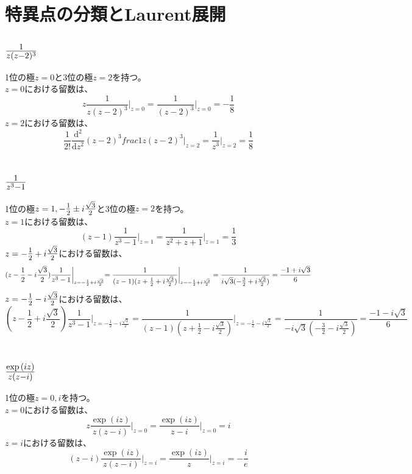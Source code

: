 \documentclass[dvipdfmx,a4paper]{jsarticle}
\begin{document}
\section{特異点の分類とLaurent展開}
\subsection{}
\subsubsection{$\mbox{\Large $\frac{1}{z(z-2)^3}$}$}
1位の極$z = 0$と3位の極$z = 2$を持つ。\\
$z = 0$における留数は、
$$
z\frac{1}{z(z-2)^3}\biggl|_{z = 0} = \frac{1}{(z-2)^3}\biggl|_{z = 0} = -\frac{1}{8}
$$
$z = 2$における留数は、
$$
\frac{1}{2!}\frac{\mathrm{d}^2}{\mathrm{d}z^2}(z-2)^3frac{1}{z(z-2)^3}\biggl|_{z = 2} = \frac{1}{z^3}\biggl|_{z = 2} = \frac{1}{8}
$$
\\

\subsubsection{$\mbox{\Large $\frac{1}{z^3-1}$}$}
1位の極$z = 1, -\mbox{\large $\frac{1}{2}$} \pm i \mbox{\large$\frac{\sqrt{3}}{2}$}$と3位の極$z = 2$を持つ。\\
$z = 1$における留数は、
$$
(z-1)\frac{1}{z^3-1}\biggl|_{z = 1} = \frac{1}{z^2 + z + 1}\biggl|_{z = 1} = \frac{1}{3}
$$
$z =  -\mbox{\large $\frac{1}{2}$} + i \mbox{\large$\frac{\sqrt{3}}{2}$}$における留数は、
$$
(z - \frac{1}{2} - i\frac{\sqrt{3}}{2})\frac{1}{z^3-1}\biggl|_{z = -\frac{1}{2} + i\frac{\sqrt{3}}{2}} = \frac{1}{(z-1)(z + \frac{1}{2} + i\frac{\sqrt{3}}{2})}\biggl|_{z = -\frac{1}{2} + i\frac{\sqrt{3}}{2}}\\
= \frac{1}{i\sqrt{3}(-\frac{3}{2} + i\frac{\sqrt{3}}{2})} = \frac{-1 + i\sqrt{3}}{6}
$$
$z =  -\mbox{\large $\frac{1}{2}$} - i \mbox{\large$\frac{\sqrt{3}}{2}$}$における留数は、
$$
(z - \frac{1}{2} + i\frac{\sqrt{3}}{2})\frac{1}{z^3-1}\biggl|_{z = -\frac{1}{2} - i\frac{\sqrt{3}}{2}} = \frac{1}{(z-1)(z + \frac{1}{2} - i\frac{\sqrt{3}}{2})}\biggl|_{z = -\frac{1}{2} - i\frac{\sqrt{3}}{2}}
= \frac{1}{-i\sqrt{3}(-\frac{3}{2} - i\frac{\sqrt{3}}{2})} = \frac{-1 - i\sqrt{3}}{6}
$$
\\

\subsubsection{$\mbox{\Large $\frac{\exp{(iz)}}{z(z-i)}$}$}
1位の極$z = 0, i$を持つ。\\
$z = 0$における留数は、
$$
z\frac{\exp{(iz)}}{z(z-i)}\biggr|_{z = 0} = \frac{\exp{(iz)}}{z-i}\biggr|_{z = 0} = i
$$
$z = i$における留数は、
$$
(z-i)\frac{\exp{(iz)}}{z(z-i)}\biggr|_{z = i} = \frac{\exp{(iz)}}{z}\biggr|_{z = i} = -\frac{i}{e}
$$
\\
\end{document}
